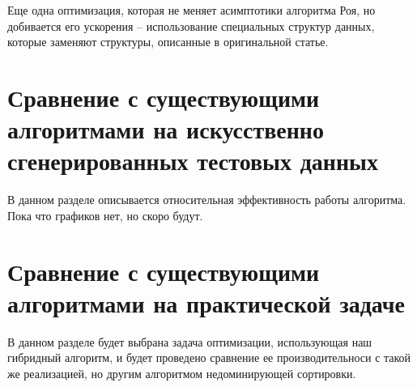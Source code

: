 Еще одна оптимизация, которая не меняет асимптотики алгоритма Роя, но добивается его ускорения -- использование специальных структур данных, которые заменяют структуры, описанные в оригинальной статье.

\section{Сравнение с существующими алгоритмами на искусственно сгенерированных тестовых данных}

В данном разделе описывается относительная эффективность работы алгоритма. Пока что графиков нет, но скоро будут.

\section{Сравнение с существующими алгоритмами на практической задаче}

В данном разделе будет выбрана задача оптимизации, использующая наш гибридный алгоритм, и будет проведено сравнение ее производительноси с такой же реализацией, но другим алгоритмом недоминирующей сортировки.


